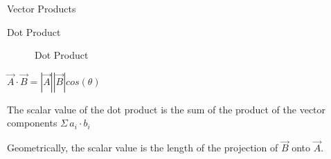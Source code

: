 \begin{section}{Vector Products}
  \begin{subsection}{Dot Product}
    \begin{figure}[h!]
      \begin{center}
        \caption{Dot Product}
      \end{center}
    \end{figure}
    $\vec{A}\cdot\vec{B} =
    \left|\vec{A}\right|\left|\vec{B}\right|cos(\theta)$

    The scalar value of the dot product is the sum of the product of
    the vector components $\Sigma\, a_i \cdot b_i$

    Geometrically, the scalar value is the length of the projection of
    $\vec{B}$ onto $\vec{A}$.
    \FloatBarrier
  \end{subsection}


\end{section}
